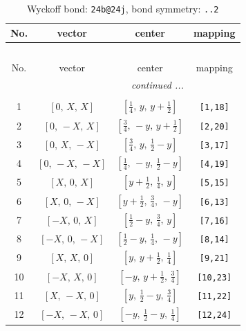 \documentclass[fleqn,8pt]{jsarticle}
\begin{document}
\begin{longtable}{cccc}
\caption{Wyckoff bond: {\tt 24b@24j}, bond symmetry: {\tt ..2}}
 \\
 \hline \hline
No. & vector & center & mapping \\ \hline \endfirsthead

\multicolumn{3}{l}{\tablename\ \thetable{}} \\
 \hline \hline
No. & vector & center & mapping \\ \hline \endhead

 \hline \hline
\multicolumn{3}{r}{\footnotesize\it continued ...} \\ \endfoot

 \hline \hline
\multicolumn{3}{r}{} \\ \endlastfoot

1 & $\left[ 0,\, X,\, X \right]$ & $\left[ \frac{1}{4},\, y,\, y + \frac{1}{2} \right]$ & {\tt [1,18]} \\ \hline
2 & $\left[ 0,\, - X,\, X \right]$ & $\left[ \frac{3}{4},\, - y,\, y + \frac{1}{2} \right]$ & {\tt [2,20]} \\ \hline
3 & $\left[ 0,\, X,\, - X \right]$ & $\left[ \frac{3}{4},\, y,\, \frac{1}{2} - y \right]$ & {\tt [3,17]} \\ \hline
4 & $\left[ 0,\, - X,\, - X \right]$ & $\left[ \frac{1}{4},\, - y,\, \frac{1}{2} - y \right]$ & {\tt [4,19]} \\ \hline
5 & $\left[ X,\, 0,\, X \right]$ & $\left[ y + \frac{1}{2},\, \frac{1}{4},\, y \right]$ & {\tt [5,15]} \\ \hline
6 & $\left[ X,\, 0,\, - X \right]$ & $\left[ y + \frac{1}{2},\, \frac{3}{4},\, - y \right]$ & {\tt [6,13]} \\ \hline
7 & $\left[ - X,\, 0,\, X \right]$ & $\left[ \frac{1}{2} - y,\, \frac{3}{4},\, y \right]$ & {\tt [7,16]} \\ \hline
8 & $\left[ - X,\, 0,\, - X \right]$ & $\left[ \frac{1}{2} - y,\, \frac{1}{4},\, - y \right]$ & {\tt [8,14]} \\ \hline
9 & $\left[ X,\, X,\, 0 \right]$ & $\left[ y,\, y + \frac{1}{2},\, \frac{1}{4} \right]$ & {\tt [9,21]} \\ \hline
10 & $\left[ - X,\, X,\, 0 \right]$ & $\left[ - y,\, y + \frac{1}{2},\, \frac{3}{4} \right]$ & {\tt [10,23]} \\ \hline
11 & $\left[ X,\, - X,\, 0 \right]$ & $\left[ y,\, \frac{1}{2} - y,\, \frac{3}{4} \right]$ & {\tt [11,22]} \\ \hline
12 & $\left[ - X,\, - X,\, 0 \right]$ & $\left[ - y,\, \frac{1}{2} - y,\, \frac{1}{4} \right]$ & {\tt [12,24]} \\ \hline

\end{longtable}
\end{document}
